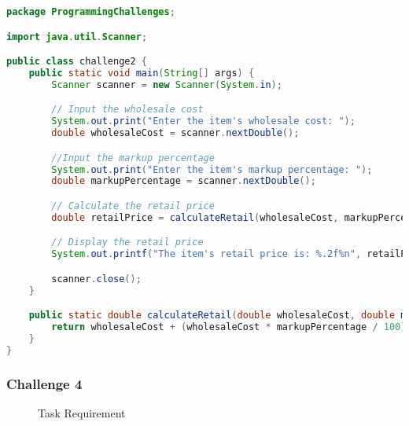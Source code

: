 \documentclass{article}
\begin{document}
\begin{lstlisting}[language=Java, caption=Challenge2.java]
package ProgrammingChallenges;

import java.util.Scanner;

public class challenge2 {
    public static void main(String[] args) {
        Scanner scanner = new Scanner(System.in);

        // Input the wholesale cost
        System.out.print("Enter the item's wholesale cost: ");
        double wholesaleCost = scanner.nextDouble();

        //Input the markup percentage
        System.out.print("Enter the item's markup percentage: ");
        double markupPercentage = scanner.nextDouble();

        // Calculate the retail price
        double retailPrice = calculateRetail(wholesaleCost, markupPercentage);

        // Display the retail price
        System.out.printf("The item's retail price is: %.2f%n", retailPrice);

        scanner.close();
    }

    public static double calculateRetail(double wholesaleCost, double markupPercentage) {
        return wholesaleCost + (wholesaleCost * markupPercentage / 100);
    }
}
\end{lstlisting}

\subsubsection*{Challenge 4}

\begin{figure}[h]
    \centering
    \caption{Task Requirement}
\end{figure}
\end{document}
